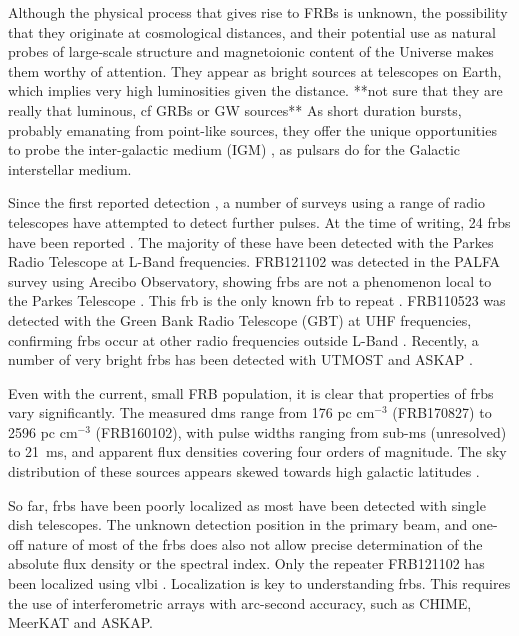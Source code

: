 \documentclass[a4paper,fleqn,usenatbib]{mnras}
\begin{document}
Although the physical process that gives rise to FRBs is unknown, the
possibility that they originate at cosmological distances, and their potential
use as natural probes of large-scale structure and magnetoionic content of the
Universe makes them worthy of attention. They appear as bright sources at
telescopes on Earth, which implies very high luminosities given the distance.
**not sure that they are really that luminous, cf GRBs or GW sources** As short
duration bursts, probably emanating from point-like sources, they offer the
unique opportunities to probe the inter-galactic medium (IGM)
\citep{2013ApJ...776..125M}, as pulsars do for the Galactic interstellar medium.

Since the first reported detection \citep{2007Sci...318..777L}, a
number of surveys using a range of radio telescopes have attempted to
detect further pulses. At the time of writing, 24 \glspl{frb} have
been reported \citep[for an up-to-date list,
  see][]{2016PASA...33...45P}. The majority of these have been
detected with the Parkes Radio Telescope at L-Band
frequencies. FRB121102 was detected in the PALFA survey using Arecibo
Observatory, showing \glspl{frb} are not a phenomenon local to the
Parkes Telescope \citep{2014ApJ...790..101S}. This \gls{frb} is the
only known \gls{frb} to repeat \citep{2016ApJ...833..177S}. FRB110523
was detected with the Green Bank Radio Telescope (GBT) at UHF
frequencies, confirming \glspl{frb} occur at other radio frequencies
outside L-Band \citep{2015Natur.528..523M}.  Recently, a number of
very bright \glspl{frb} has been detected with UTMOST
\citep{2017MNRAS.468.3746C,atel10697} and ASKAP
\citep{2017ApJ...841L..12B}.

Even with the current, small FRB population, it is clear that
properties of \glspl{frb} vary significantly. The measured \glspl{dm}
range from 176 pc cm$^{-3}$ (FRB170827) to 2596 pc cm$^{-3}$
(FRB160102), with pulse widths ranging from sub-ms (unresolved) to
21~ms, and apparent flux densities covering four orders of
magnitude. The sky distribution of these sources appears skewed
towards high galactic latitudes \citep{2015MNRAS.451.3278M}.

So far, \glspl{frb} have been poorly localized as most have been
detected with single dish telescopes. The unknown detection position
in the primary beam, and one-off nature of most of the \glspl{frb}
does also not allow precise determination of the absolute flux density
or the spectral index. Only the repeater FRB121102 has been localized
using \gls{vlbi} \citep{2017ApJ...834L...8M,
  2017ApJ...834L...7T}. Localization is key to understanding
\glspl{frb}. This requires the use of interferometric arrays with
arc-second accuracy, such as CHIME, MeerKAT and ASKAP. 
\end{document}
